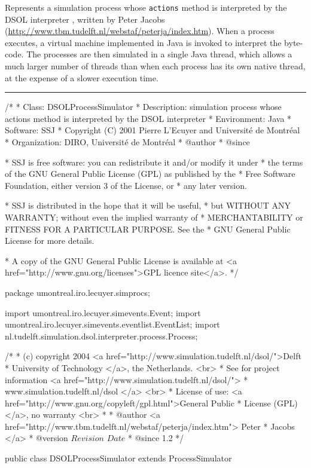 
Represents a simulation process whose \texttt{actions} method is
interpreted by the DSOL interpreter \cite{iJAC05a}, written by
Peter Jacobs (\url{http://www.tbm.tudelft.nl/webstaf/peterja/index.htm}).
When a process executes, a virtual machine
implemented in Java is invoked to interpret the byte-code.
The processes are then simulated in a single Java thread, which allows
a much larger number of threads than when each process has its own
native thread, at the expense of a slower execution time.


\bigskip\hrule

\begin{code}
\begin{hide}
/*
 * Class:        DSOLProcessSimulator
 * Description:  simulation process whose actions method is interpreted by
                 the DSOL interpreter
 * Environment:  Java
 * Software:     SSJ 
 * Copyright (C) 2001  Pierre L'Ecuyer and Université de Montréal
 * Organization: DIRO, Université de Montréal
 * @author       
 * @since

 * SSJ is free software: you can redistribute it and/or modify it under
 * the terms of the GNU General Public License (GPL) as published by the
 * Free Software Foundation, either version 3 of the License, or
 * any later version.

 * SSJ is distributed in the hope that it will be useful,
 * but WITHOUT ANY WARRANTY; without even the implied warranty of
 * MERCHANTABILITY or FITNESS FOR A PARTICULAR PURPOSE.  See the
 * GNU General Public License for more details.

 * A copy of the GNU General Public License is available at
   <a href="http://www.gnu.org/licenses">GPL licence site</a>.
 */
\end{hide}
package umontreal.iro.lecuyer.simprocs;\begin{hide}

import umontreal.iro.lecuyer.simevents.Event;
import umontreal.iro.lecuyer.simevents.eventlist.EventList;
import nl.tudelft.simulation.dsol.interpreter.process.Process;

/*
 * (c) copyright 2004 <a href="http://www.simulation.tudelft.nl/dsol/">Delft
 * University of Technology </a>, the Netherlands. <br>
 * See for project information <a href="http://www.simulation.tudelft.nl/dsol/">
 * www.simulation.tudelft.nl/dsol </a> <br>
 * License of use: <a href="http://www.gnu.org/copyleft/gpl.html">General Public
 * License (GPL) </a>, no warranty <br>
 *
 * @author <a href="http://www.tbm.tudelft.nl/webstaf/peterja/index.htm"> Peter
 *         Jacobs </a>
 * @version $Revision$ $Date$
 * @since 1.2
 */ \end{hide}


public class DSOLProcessSimulator extends ProcessSimulator\begin{hide} {
\end{hide}
\end{code}

